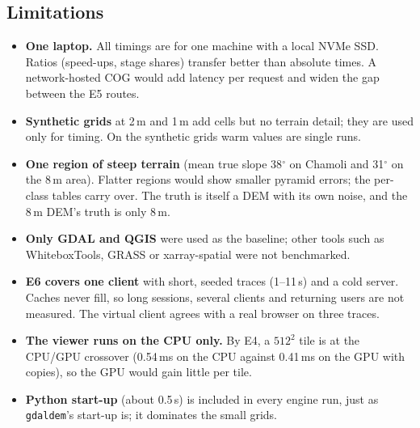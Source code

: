 \documentclass[11pt,a4paper]{article}
\begin{document}
\subsection{Limitations}
\begin{itemize}
  \item \textbf{One laptop.} All timings are for one machine with a local NVMe SSD. Ratios (speed-ups, stage shares)
  transfer better than absolute times. A network-hosted COG would add latency per request and widen the gap between
  the E5 routes.
  \item \textbf{Synthetic grids} at 2\,m and 1\,m add cells but no terrain detail; they are used only for timing.
  On the synthetic grids warm values are single runs.
  \item \textbf{One region of steep terrain} (mean true slope 38$^\circ$ on Chamoli and 31$^\circ$ on the 8\,m area).
  Flatter regions would show smaller pyramid errors; the per-class tables carry over. The truth is itself a DEM with
  its own noise, and the 8\,m DEM's truth is only 8\,m.
  \item \textbf{Only GDAL and QGIS} were used as the baseline; other tools such as WhiteboxTools, GRASS or
  xarray-spatial were not benchmarked.
  \item \textbf{E6 covers one client} with short, seeded traces (1--11\,s) and a cold server. Caches never fill, so
  long sessions, several clients and returning users are not measured. The virtual client agrees with a real browser
  on three traces.
  \item \textbf{The viewer runs on the CPU only.} By E4, a $512^2$ tile is at the CPU/GPU crossover (0.54\,ms on
  the CPU against 0.41\,ms on the GPU with copies), so the GPU would gain little per tile.
  \item \textbf{Python start-up} (about 0.5\,s) is included in every engine run, just as \texttt{gdaldem}'s start-up
  is; it dominates the small grids.
\end{itemize}
\end{document}
